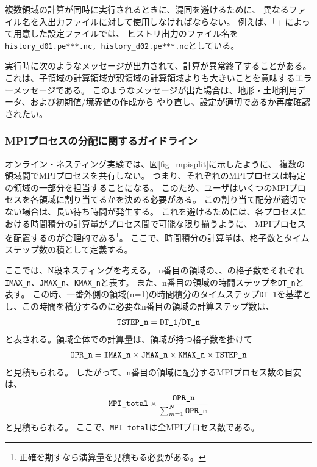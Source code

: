 複数領域の計算が同時に実行されるときに、混同を避けるために、
異なるファイル名を入出力ファイルに対して使用しなければならない。
例えば、「\makeconftool」によって用意した設定ファイルでは、
ヒストリ出力のファイル名を\verb|history_d01.pe***.nc, history_d02.pe***.nc|としている。

実行時に次のようなメッセージが出力されて、計算が異常終了することがある。
これは、子領域の計算領域が親領域の計算領域よりも大きいことを意味するエラーメッセージである。
このようなメッセージが出た場合は、地形・土地利用データ、および初期値/境界値の作成から
やり直し、設定が適切であるか再度確認されたい。

\subsubsection{MPIプロセスの分配に関するガイドライン}
オンライン・ネスティング実験では、図\ref{fig_mpisplit}に示したように、
複数の領域間でMPIプロセスを共有しない。
つまり、それぞれのMPIプロセスは特定の領域の一部分を担当することになる。
このため、ユーザはいくつのMPIプロセスを各領域に割り当てるかを決める必要がある。
この割り当て配分が適切でない場合は、長い待ち時間が発生する。
これを避けるためには、各プロセスにおける時間積分の計算量がプロセス間で可能な限り揃うように、
MPIプロセスを配置するのが合理的である\footnote{正確を期すなら演算量を見積もる必要がある。}。
ここで、時間積分の計算量は、格子数とタイムステップ数の積として定義する。

ここでは、N段ネスティングを考える。
n番目の領域の{\XDIR}、{\YDIR}、{\ZDIR}の格子数をそれぞれ\verb|IMAX_n|、\verb|JMAX_n|、\verb|KMAX_n|と表す。
また、n番目の領域の時間ステップを\verb|DT_n|と表す。
この時、一番外側の領域(n=1)の時間積分のタイムステップ\verb|DT_1|を基準とし、この時間を積分するのに必要なn番目の領域の計算ステップ数は、
\begin{eqnarray}
 \verb|TSTEP_n| = \verb|DT_1| / \verb|DT_n|  \nonumber
\end{eqnarray}
と表される。領域全体での計算量は、領域が持つ格子数を掛けて
\begin{eqnarray}
 \verb|OPR_n| = \verb|IMAX_n| \times \verb|JMAX_n| \times \verb|KMAX_n| \times \verb|TSTEP_n| \nonumber
\end{eqnarray}
と見積もられる。
したがって、n番目の領域に配分するMPIプロセス数の目安は、
\begin{eqnarray}
 \verb|MPI_total| \times \frac{ \texttt{OPR\_n} }{ \sum_{m=1}^N \texttt{OPR\_m} }
\end{eqnarray}
と見積もられる。
ここで、\verb|MPI_total|は全MPIプロセス数である。


